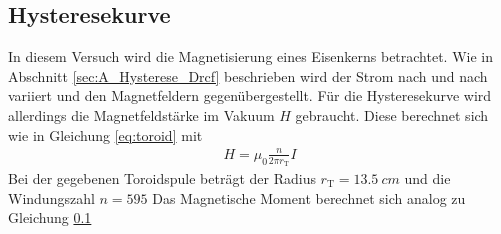 \subsection{Hysteresekurve}
In diesem Versuch wird die Magnetisierung eines Eisenkerns betrachtet.
Wie in Abschnitt \ref{sec:A_Hysterese_Drcf} beschrieben wird der Strom nach und nach variiert 
und den Magnetfeldern gegenübergestellt.
Für die Hysteresekurve wird allerdings die Magnetfeldstärke im Vakuum $H$ gebraucht.
Diese berechnet sich wie in Gleichung \ref{eq:toroid} mit
\begin{align*}
    H =  \mu_0 \frac{n}{2 \pi r_\text{T}} I
\end{align*}
Bei der gegebenen Toroidspule beträgt der Radius $r_\text{T}= \qty{13.5}{cm}$ und die Windungszahl $n = 595$
Das Magnetische Moment berechnet sich analog zu Gleichung \ref{} 




